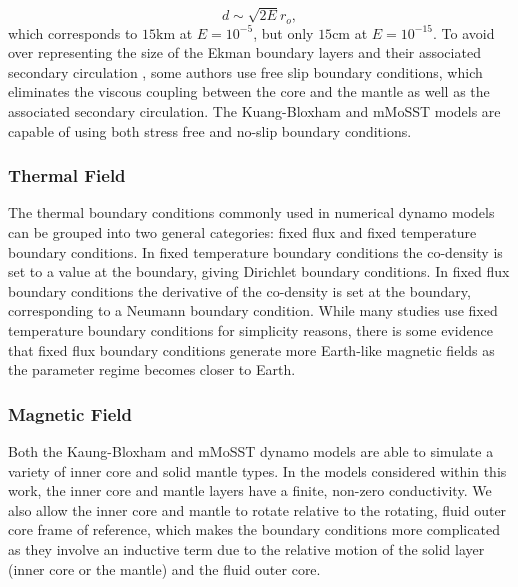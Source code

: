 \begin{equation}
d\sim \sqrt{2E} r_{o},
\end{equation}
which corresponds to $15$km at $E=10^{-5}$, but only $15$cm at $E=10^{-15}$. To avoid over representing the size of the Ekman boundary layers and their associated secondary circulation \citep{gubbins2007}, some authors \citep{kuangandbloxham1999} use free slip boundary conditions, which eliminates the viscous coupling between the core and the mantle as well as the associated secondary circulation. The Kuang-Bloxham and mMoSST models are capable of using both stress free and no-slip boundary conditions. 

\subsubsection{Thermal Field}
The thermal boundary conditions commonly used in numerical dynamo models can be grouped into two general categories: fixed flux and fixed temperature boundary conditions. In fixed temperature boundary conditions the co-density is set to a value at the boundary, giving Dirichlet boundary conditions. In fixed flux boundary conditions the derivative of the co-density is set at the boundary, corresponding to a Neumann boundary condition. While many studies use fixed temperature boundary conditions for simplicity reasons, there is some evidence \citep{sakuraba2009} that fixed flux boundary conditions generate more Earth-like magnetic fields as the parameter regime becomes closer to Earth.

\subsubsection{Magnetic Field}
Both the Kaung-Bloxham and mMoSST dynamo models are able to simulate a variety of inner core and solid mantle types. In the models considered within this work, the inner core and mantle layers have a finite, non-zero conductivity. We also allow the inner core and mantle to rotate relative to the rotating, fluid outer core frame of reference, which makes the boundary conditions more complicated as they involve an inductive term due to the relative motion of the solid layer (inner core or the mantle) and the fluid outer core.

